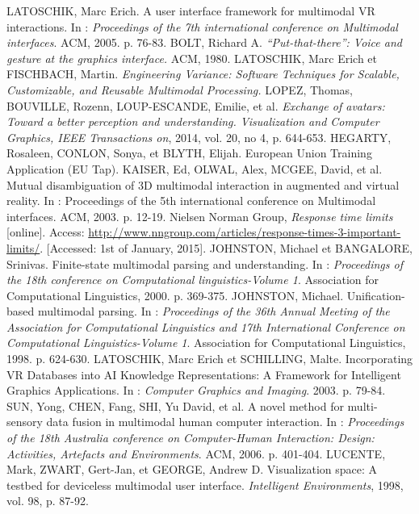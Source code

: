 \documentclass[a4paper]{article}
\begin{document}
\begin{thebibliography}{1}
	 LATOSCHIK, Marc Erich. A user interface framework for multimodal VR interactions. In : \textit{Proceedings of the 7th international conference on Multimodal interfaces}. ACM, 2005. p. 76-83.
	 BOLT, Richard A. \textit{“Put-that-there”: Voice and gesture at the graphics interface.} ACM, 1980.
	 LATOSCHIK, Marc Erich et FISCHBACH, Martin. \textit{Engineering Variance: Software Techniques for Scalable, Customizable, and Reusable Multimodal Processing.}
	 LOPEZ, Thomas, BOUVILLE, Rozenn, LOUP-ESCANDE, Emilie, et al. \textit{Exchange of avatars: Toward a better perception and understanding. Visualization and Computer Graphics, IEEE Transactions on}, 2014, vol. 20, no 4, p. 644-653.
	 HEGARTY, Rosaleen, CONLON, Sonya, et BLYTH, Elijah. European Union Training Application (EU Tap).
	 KAISER, Ed, OLWAL, Alex, MCGEE, David, et al. Mutual disambiguation of 3D multimodal interaction in augmented and virtual reality. In : Proceedings of the 5th international conference on Multimodal interfaces. ACM, 2003. p. 12-19.
	 Nielsen Norman Group, \textit{Response time limits} [online]. Access: \url{http://www.nngroup.com/articles/response-times-3-important-limits/}. [Accessed: 1st of January, 2015].
	 JOHNSTON, Michael et BANGALORE, Srinivas. Finite-state multimodal parsing and understanding. In : \textit{Proceedings of the 18th conference on Computational linguistics-Volume 1}. Association for Computational Linguistics, 2000. p. 369-375.
	 JOHNSTON, Michael. Unification-based multimodal parsing. In : \textit{Proceedings of the 36th Annual Meeting of the Association for Computational Linguistics and 17th International Conference on Computational Linguistics-Volume 1}. Association for Computational Linguistics, 1998. p. 624-630.
	 LATOSCHIK, Marc Erich et SCHILLING, Malte. Incorporating VR Databases into AI Knowledge Representations: A Framework for Intelligent Graphics Applications. In : \textit{Computer Graphics and Imaging}. 2003. p. 79-84.
	 SUN, Yong, CHEN, Fang, SHI, Yu David, et al. A novel method for multi-sensory data fusion in multimodal human computer interaction. In : \textit{Proceedings of the 18th Australia conference on Computer-Human Interaction: Design: Activities, Artefacts and Environments}. ACM, 2006. p. 401-404.
	 LUCENTE, Mark, ZWART, Gert-Jan, et GEORGE, Andrew D. Visualization space: A testbed for deviceless multimodal user interface. \textit{Intelligent Environments}, 1998, vol. 98, p. 87-92.
\end{thebibliography}
\end{document}
